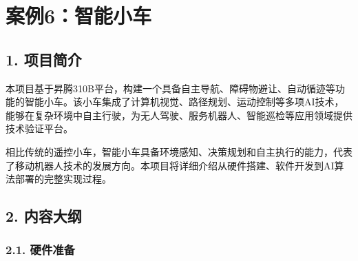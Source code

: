 \chapter{案例6：智能小车}\label{ux6848ux4f8b6ux667aux80fdux5c0fux8f66}

\section{1. 项目简介}\label{ux9879ux76eeux7b80ux4ecb}

本项目基于昇腾310B平台，构建一个具备自主导航、障碍物避让、自动循迹等功能的智能小车。该小车集成了计算机视觉、路径规划、运动控制等多项AI技术，能够在复杂环境中自主行驶，为无人驾驶、服务机器人、智能巡检等应用领域提供技术验证平台。

相比传统的遥控小车，智能小车具备环境感知、决策规划和自主执行的能力，代表了移动机器人技术的发展方向。本项目将详细介绍从硬件搭建、软件开发到AI算法部署的完整实现过程。

\section{2. 内容大纲}\label{ux5185ux5bb9ux5927ux7eb2}

\subsection{2.1. 硬件准备}\label{ux786cux4ef6ux51c6ux5907}

